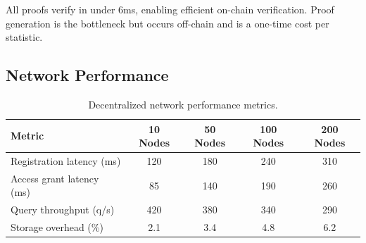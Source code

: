 All proofs verify in under 6ms, enabling efficient on-chain verification. Proof generation is the bottleneck but occurs off-chain and is a one-time cost per statistic.

\subsection{Network Performance}

\begin{table}[htbp]
\centering
\caption{Decentralized network performance metrics.}
\label{tab:network}
\begin{tabular}{lcccc}
\toprule
\textbf{Metric} & \textbf{10 Nodes} & \textbf{50 Nodes} & \textbf{100 Nodes} & \textbf{200 Nodes} \\
\midrule
Registration latency (ms) & 120 & 180 & 240 & 310 \\
Access grant latency (ms) & 85 & 140 & 190 & 260 \\
Query throughput (q/s) & 420 & 380 & 340 & 290 \\
Storage overhead (\%) & 2.1 & 3.4 & 4.8 & 6.2 \\
\bottomrule
\end{tabular}
\end{table}

